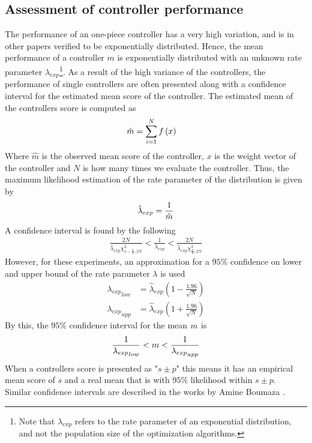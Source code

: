 \subsection{Assessment of controller performance \label{sec:confidenceIntervals}}
The performance of an one-piece controller has a very high variation,
and is in other papers verified to be exponentially distributed. Hence, the mean
performance of a controller $m$ is exponentially distributed with an unknown 
rate parameter  $\lambda_{exp}$\footnote{Note that $\lambda_{exp}$ refers to the rate parameter
of an exponential distribution, and not the population size of the optimization algorithms.}.
As a result of the high variance of the controllers, the performance 
of single controllers are often presented along with a confidence interval
for the estimated mean score of the controller. The estimated mean of 
the controllers score is computed as
\begin{align}
\hat{m} &= \sum_{i=1}^{N} f \left( x \right)
\end{align}
Where $\hat{m}$ is the observed mean score of the controller, $x$ is the
weight vector of the controller and $N$ is how many times we evaluate the controller.
Thus, the maximum likelihood estimation of the rate 
parameter
of the distribution is given by
\begin{align}
\hat{\lambda}_{exp} = \frac{1}{\hat{m}}
\end{align}
A confidence interval is found by the following
\begin{align}
\frac{2N}{\hat{\lambda}_{exp}\chi^{2}_{1-\frac{\alpha}{2},2N}}
<
\frac{1}{\lambda_{exp}}
< 
\frac{2N}{\hat{\lambda}_{exp}\chi^{2}_{\frac{\alpha}{2},2N}}
\end{align}
However, for these experiments, an approximation for a $95\%$
confidence on lower and upper bound 
of the rate parameter $\lambda$ is used
\begin{align}
{\lambda_{exp}}_{low} &= 
\hat{\lambda}_{exp} \left( 1 - \frac{1.96}{\sqrt{N}} \right)\\
{\lambda_{exp}}_{upp} &= 
\hat{\lambda}_{exp} \left( 1 + \frac{1.96}{\sqrt{N}} \right)
\end{align}
By this, the $95\%$ confidence interval for the mean $m$ is
\begin{align}
\frac{1}{{\lambda_{exp}}_{low}} < m < \frac{1}{{\lambda_{exp}}_{upp}}
\end{align}
When a controllers score is presented as "$s \pm p$" this means 
it has an empirical mean score of $s$ and a real mean that is with 
$95\%$ likelihood within $s \pm p$. \\
Similar confidence intervals are described in the works by Amine Boumaza \citep{boumaza2009}.
